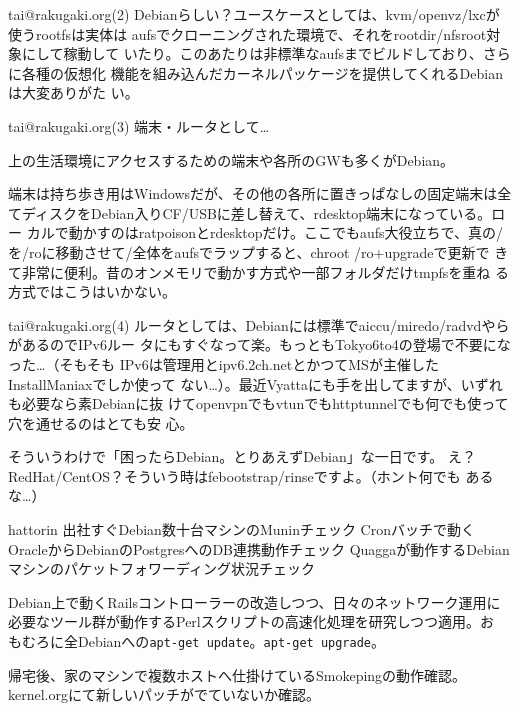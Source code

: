 \begin{frame}{tai@rakugaki.org(2)}
 Debianらしい？ユースケースとしては、kvm/openvz/lxcが使うrootfsは実体は
 aufsでクローニングされた環境で、それをrootdir/nfsroot対象にして稼動して
 いたり。このあたりは非標準なaufsまでビルドしており、さらに各種の仮想化
 機能を組み込んだカーネルパッケージを提供してくれるDebianは大変ありがた
 い。
\end{frame}

\begin{frame}{tai@rakugaki.org(3)}
端末・ルータとして…

 上の生活環境にアクセスするための端末や各所のGWも多くがDebian。

 端末は持ち歩き用はWindowsだが、その他の各所に置きっぱなしの固定端末は全
 てディスクをDebian入りCF/USBに差し替えて、rdesktop端末になっている。ロー
 カルで動かすのはratpoisonとrdesktopだけ。ここでもaufs大役立ちで、真の/
 を/roに移動させて/全体をaufsでラップすると、chroot /ro+upgradeで更新で
 きて非常に便利。昔のオンメモリで動かす方式や一部フォルダだけtmpfsを重ね
 る方式ではこうはいかない。
\end{frame}

\begin{frame}{tai@rakugaki.org(4)}
 ルータとしては、Debianには標準でaiccu/miredo/radvdやらがあるのでIPv6ルー
 タにもすぐなって楽。もっともTokyo6to4の登場で不要になった…（そもそも
 IPv6は管理用とipv6.2ch.netとかつてMSが主催したInstallManiaxでしか使って
 ない…）。最近Vyattaにも手を出してますが、いずれも必要なら素Debianに抜
 けてopenvpnでもvtunでもhttptunnelでも何でも使って穴を通せるのはとても安
 心。

 そういうわけで「困ったらDebian。とりあえずDebian」な一日です。
 え？RedHat/CentOS？そういう時はfebootstrap/rinseですよ。（ホント何でも
 あるな…）
\end{frame}

\begin{frame}{hattorin}
出社すぐDebian数十台マシンのMuninチェック
Cronバッチで動くOracleからDebianのPostgresへのDB連携動作チェック
Quaggaが動作するDebianマシンのパケットフォワーディング状況チェック

Debian上で動くRailsコントローラーの改造しつつ、日々のネットワーク運用に
 必要なツール群が動作するPerlスクリプトの高速化処理を研究しつつ適用。お
 もむろに全Debianへの\texttt{apt-get update}。\texttt{apt-get upgrade}。

帰宅後、家のマシンで複数ホストへ仕掛けているSmokepingの動作確認。
kernel.orgにて新しいパッチがでていないか確認。
\end{frame}

